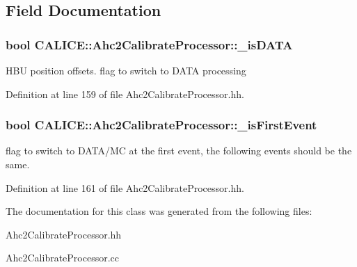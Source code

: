 \subsection{Field Documentation}
\subsubsection[{\_\-isDATA}]{\setlength{\rightskip}{0pt plus 5cm}bool {\bf CALICE::Ahc2CalibrateProcessor::\_\-isDATA}\hspace{0.3cm}{\ttfamily  [protected]}}\label{classCALICE_1_1Ahc2CalibrateProcessor_af7fd3817f6aefdd07f107c05ed8f61f4}


HBU position offsets. flag to switch to DATA processing 

Definition at line 159 of file Ahc2CalibrateProcessor.hh.
\subsubsection[{\_\-isFirstEvent}]{\setlength{\rightskip}{0pt plus 5cm}bool {\bf CALICE::Ahc2CalibrateProcessor::\_\-isFirstEvent}\hspace{0.3cm}{\ttfamily  [protected]}}\label{classCALICE_1_1Ahc2CalibrateProcessor_af4cd3d6df2a690c09a6eb2689505a4b4}


flag to switch to DATA/MC at the first event, the following events should be the same. 

Definition at line 161 of file Ahc2CalibrateProcessor.hh.

The documentation for this class was generated from the following files:\begin{DoxyCompactItemize}
\item 
Ahc2CalibrateProcessor.hh\item 
Ahc2CalibrateProcessor.cc\end{DoxyCompactItemize}
